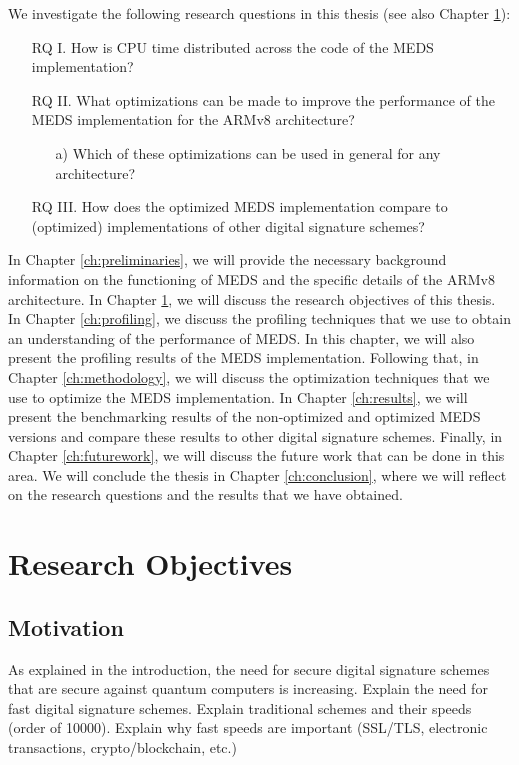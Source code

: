 \documentclass[11pt,a4paper]{report}
\theoremstyle{definition}
\begin{document}
We investigate the following research questions in this thesis (see also Chapter \ref{ch:researchobjectives}):
\begin{itemize}[left=35pt,labelsep=15pt]
  \item[RQ I.] How is CPU time distributed across the code of the MEDS implementation?
  \item[RQ II.] What optimizations can be made to improve the performance of the MEDS implementation for the ARMv8 architecture?
  \begin{itemize}
    \item[a)] Which of these optimizations can be used in general for any 
    architecture?
  \end{itemize}
  \item[RQ III.] How does the optimized MEDS implementation compare to (optimized) implementations of other digital signature schemes?
\end{itemize}

In Chapter \ref{ch:preliminaries}, we will provide the necessary background information on the functioning of MEDS and the specific details of the ARMv8 architecture. In Chapter \ref{ch:researchobjectives}, we will discuss the research objectives of this thesis. In Chapter \ref{ch:profiling}, we discuss the profiling techniques that we use to obtain an understanding of the performance of MEDS. In this chapter, we will also present the profiling results of the MEDS implementation. Following that, in Chapter \ref{ch:methodology}, we will discuss the optimization techniques that we use to optimize the MEDS implementation. In Chapter \ref{ch:results}, we will present the benchmarking results of the non-optimized and optimized MEDS versions and compare these results to other digital signature schemes. Finally, in Chapter \ref{ch:futurework}, we will discuss the future work that can be done in this area. We will conclude the thesis in Chapter \ref{ch:conclusion}, where we will reflect on the research questions and the results that we have obtained.


\chapter{Research Objectives}
\label{ch:researchobjectives}

\section{Motivation}
As explained in the introduction, the need for secure digital signature schemes that are secure against quantum computers is increasing.
Explain the need for fast digital signature schemes.
Explain traditional schemes and their speeds (order of 10000).
Explain why fast speeds are important (SSL/TLS, electronic transactions, crypto/blockchain, etc.)
\end{document}
